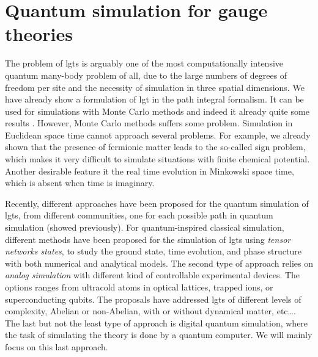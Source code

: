 \section{Quantum simulation for gauge theories}
\label{sec:quantum_simulation_for_gauge_theories}


The problem of \ac{lgt}s is arguably one of the most computationally intensive quantum many-body problem of all, due to the large numbers of degrees of freedom per site and the necessity of simulation in three spatial dimensions.
We have already show a formulation of \ac{lgt} in the path integral formalism.
It can be used for simulations with Monte Carlo methods and indeed it already quite some results \citneeded.
However, Monte Carlo methods suffers some problem.
Simulation in Euclidean space time cannot approach several problems.
For example, we already shown that the presence of fermionic matter leads to the so-called sign problem, which makes it very difficult to simulate situations with finite chemical potential.
Another desirable feature it the real time evolution in Minkowski space time, which is absent when time is imaginary.

Recently, different approaches have been proposed for the quantum simulation of \ac{lgt}s, from different communities, one for each possible path in quantum simulation (showed previously).
For quantum-inspired classical simulation, different methods have been proposed for the simulation of \ac{lgt}s using \emph{tensor networks states}, to study the ground state, time evolution, and phase structure with both numerical and analytical models.
The second type of approach relies on \emph{analog simulation} with different kind of controllable experimental devices.
The options ranges from ultracold atoms in optical lattices\citneeded, trapped ions\citneeded, or superconducting qubits\citneeded.
The proposals have addressed \ac{lgt}s of different levels of complexity, Abelian or non-Abelian, with or without dynamical matter, etc\dots.
The last but not the least type of approach is digital quantum simulation, where the task of simulating the theory is done by a quantum computer.
We will mainly focus on this last approach.

